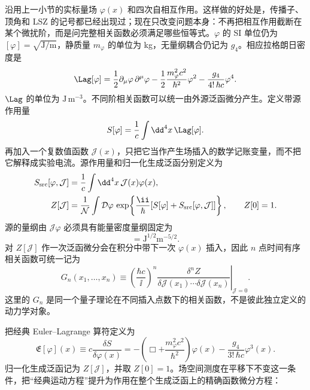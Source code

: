 
沿用上一小节的实标量场 $\varphi(x)$ 和四次自相互作用。这样做的好处是，传播子、顶角和 LSZ 的记号都已经出现过；现在只改变问题本身：不再把相互作用截断在某个微扰阶，而是问完整相关函数必须满足哪些恒等式。$\varphi$ 的 SI 单位仍为 $[\varphi]=\sqrt{\mathrm{J/m}}$，静质量 $m_\varphi$ 的单位为 kg，无量纲耦合仍记为 $g_4$。相应拉格朗日密度是
\begin{equation}
 {
 \Lag[\varphi]
 =\frac12\partial_\mu\varphi\,\partial^\mu\varphi
 -\frac12\frac{m_\varphi^2c^2}{\hbar^2}\varphi^2
 -\frac{g_4}{4!\,\hbar c}\varphi^4.}
 \label{eq:SD-scalar-L-SI-r12}
\end{equation}
$\Lag$ 的单位为 $\mathrm{J\,m^{-3}}$。不同阶相关函数可以统一由外源泛函微分产生。定义带源作用量
\begin{equation*}
 S[\varphi]=\frac1c\int\dd^4 x\,\Lag[\varphi].
\end{equation*}
再加入一个复数值函数 $\mathcal J(x)$，只把它当作产生场插入的数学记账变量，而不把它解释成实验电流。源作用量和归一化生成泛函分别定义为
\begin{align}
 S_{\rm src}[\varphi,\mathcal J]
 &=\frac1c\int\dd^4 x\,\mathcal J(x)\varphi(x),
 \label{eq:SD-source-action-dp76}\\
 Z[\mathcal J]
 &=\frac1{\mathcal N}\int\mathcal D\varphi\,
 \exp\!\left\{\frac{\ii}{\hbar}
 [S[\varphi]+S_{\rm src}[\varphi,\mathcal J]]\right\},
 \qquad Z[0]=1.
 \label{eq:SD-generating-functional-dp76}
\end{align}
源的量纲由 $\mathcal J\varphi$ 必须具有能量密度量纲固定为
\begin{equation*}
 [\mathcal J]=\mathrm{J^{1/2}m^{-5/2}}.
\end{equation*}
对 $Z[\mathcal J]$ 作一次泛函微分会在积分中带下一次 $\varphi(x)$ 插入，因此 $n$ 点时间有序相关函数可统一记为
\begin{equation}
 G_n(x_1,\ldots,x_n)
 \equiv
 \left.
 \left(\frac{\hbar c}{\ii}\right)^n
 \frac{\delta^nZ}
 {\delta\mathcal J(x_1)\cdots\delta\mathcal J(x_n)}
 \right|_{\mathcal J=0}.
 \label{eq:SD-correlator-source-definition-dp76}
\end{equation}
这里的 $G_n$ 是同一个量子理论在不同插入点数下的相关函数，不是彼此独立定义的动力学对象。

把经典 Euler--Lagrange 算符定义为
\begin{equation}
 {
 \mathfrak E[\varphi](x)
 \equiv c\frac{\delta S}{\delta\varphi(x)}
 =-\left(\Box+\frac{m_\varphi^2c^2}{\hbar^2}\right)\varphi(x)
 -\frac{g_4}{3!\,\hbar c}\varphi^3(x).}
 \label{eq:SD-euler-operator-SI-r16}
\end{equation}
归一化生成泛函记为 $Z[\mathcal J]$，并取 $Z[0]=1$。场空间测度在平移下不变这一条件，把“经典运动方程”提升为作用在整个生成泛函上的精确函数微分方程：


